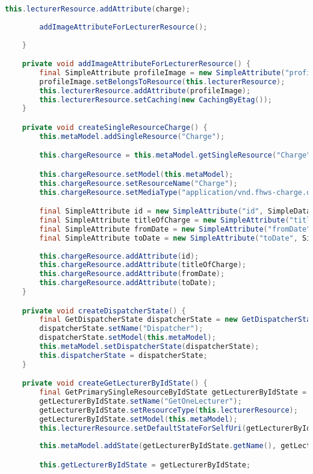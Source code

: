 \begin{lstlisting}[label=lst:enfield_model,
language=java,
firstnumber=1,
caption=Beschreibung des \textit{Enfield-Modell} der Referenzimplementierung. ]
		this.lecturerResource.addAttribute(charge);
		
		addImageAttributeForLecturerResource();
		
	}

	private void addImageAttributeForLecturerResource() {
		final SimpleAttribute profileImage = new SimpleAttribute("profileImageUrl", SimpleDatatype.IMAGE);
		profileImage.setBelongsToResource(this.lecturerResource);
		this.lecturerResource.addAttribute(profileImage);
		this.lecturerResource.setCaching(new CachingByEtag());
	}

	private void createSingleResourceCharge() {
		this.metaModel.addSingleResource("Charge");

		this.chargeResource = this.metaModel.getSingleResource("Charge");

		this.chargeResource.setModel(this.metaModel);
		this.chargeResource.setResourceName("Charge");
		this.chargeResource.setMediaType("application/vnd.fhws-charge.default+json");

		final SimpleAttribute id = new SimpleAttribute("id", SimpleDatatype.INT);
		final SimpleAttribute titleOfCharge = new SimpleAttribute("title", SimpleDatatype.STRING);
		final SimpleAttribute fromDate = new SimpleAttribute("fromDate", SimpleDatatype.DATE);
		final SimpleAttribute toDate = new SimpleAttribute("toDate", SimpleDatatype.DATE);
	
		this.chargeResource.addAttribute(id);
		this.chargeResource.addAttribute(titleOfCharge);
		this.chargeResource.addAttribute(fromDate);
		this.chargeResource.addAttribute(toDate);
	}

	private void createDispatcherState() {
		final GetDispatcherState dispatcherState = new GetDispatcherState();
		dispatcherState.setName("Dispatcher");
		dispatcherState.setModel(this.metaModel);
		this.metaModel.setDispatcherState(dispatcherState);
		this.dispatcherState = dispatcherState;
	}

	private void createGetLecturerByIdState() {
		final GetPrimarySingleResourceByIdState getLecturerByIdState = new GetPrimarySingleResourceByIdState();
		getLecturerByIdState.setName("GetOneLecturer");
		getLecturerByIdState.setResourceType(this.lecturerResource);
		getLecturerByIdState.setModel(this.metaModel);
		this.lecturerResource.setDefaultStateForSelfUri(getLecturerByIdState);
		
		this.metaModel.addState(getLecturerByIdState.getName(), getLecturerByIdState);

		this.getLecturerByIdState = getLecturerByIdState;


\end{lstlisting}
